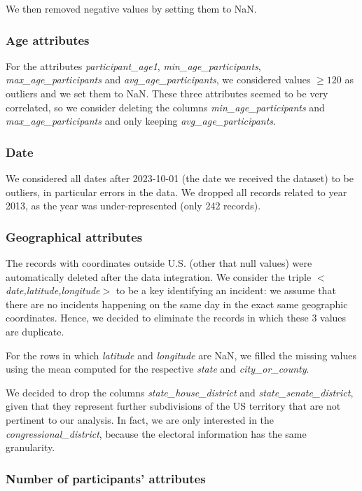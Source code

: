 \documentclass[10pt,a4paper]{report}
\begin{document}
We then removed negative values by setting them to NaN.

\subsubsection{Age attributes}

For the attributes \textit{participant\_age1}, \textit{min\_age\_participants}, \textit{max\_age\_participants} and \textit{avg\_age\_participants}, we considered values $\ge 120$ as outliers and we set them to NaN.
These three attributes seemed to be very correlated, so we consider deleting the columns \textit{min\_age\_participants} and \textit{max\_age\_participants} and only keeping \textit{avg\_age\_participants}.

\subsubsection{Date}

We considered all dates after 2023-10-01 (the date we received the dataset) to be outliers, in particular errors in the data.
We dropped all records related to year 2013, as the year was under-represented (only 242 records).

\subsubsection{Geographical attributes}

The records with coordinates outside U.S. (other that null values) were automatically deleted after the data integration.
We consider the triple \textit{$<$date,latitude,longitude$>$} to be a key identifying an incident: we assume that there are no incidents happening on the same day in the exact same geographic coordinates.
Hence, we decided to eliminate the records in which these 3 values are duplicate.

For the rows in which \textit{latitude} and \textit{longitude} are NaN, we filled the missing values using the mean computed for the respective \textit{state} and \textit{city\_or\_county}.

We decided to drop the columns \textit{state\_house\_district} and \textit{state\_senate\_district}, given that they represent further subdivisions of the US territory that are not pertinent to our analysis.
In fact, we are only interested in the \textit{congressional\_district}, because the electoral information has the same granularity.

\subsubsection{Number of participants' attributes}
\end{document}
